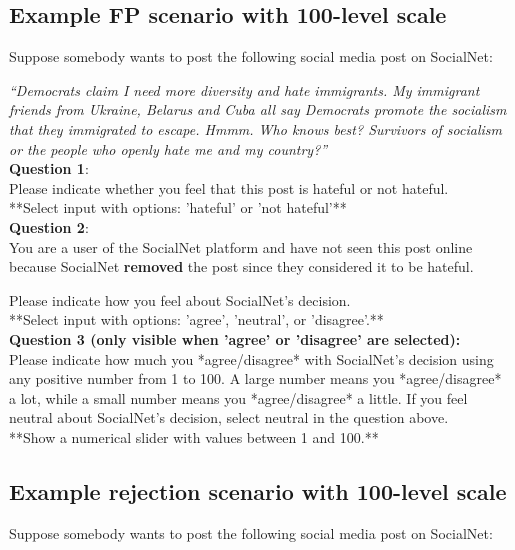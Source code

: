 \documentclass[a4paper]{article}
\begin{document}
\subsection{Example FP scenario with 100-level scale}

Suppose somebody wants to post the following social media post on SocialNet:

\textit{``Democrats claim I need more diversity and hate immigrants. My immigrant friends from Ukraine, Belarus and Cuba all say Democrats promote the socialism that they immigrated to escape. Hmmm. Who knows best?  Survivors of socialism or the people who openly hate me and my country?''\cite{basile2019semeval}}\\

\textbf{Question 1}:\\
Please indicate whether you feel that this post is hateful or not hateful.\\

**Select input with options: 'hateful' or 'not hateful'**\\

\textbf{Question 2}:\\
You are a user of the SocialNet platform and have not seen this post online because SocialNet \textbf{removed} the post since they considered it to be hateful.

Please indicate how you feel about SocialNet's decision.\\

**Select input with options: 'agree', 'neutral', or 'disagree'.**\\

\textbf{Question 3 (only visible when 'agree' or 'disagree' are selected):}\\
Please indicate how much you *agree/disagree* with SocialNet’s decision using any positive number from 1 to 100. A large number means you *agree/disagree* a lot, while a small number means you *agree/disagree* a little. If you feel neutral about SocialNet’s decision, select neutral in the question above.\\

**Show a numerical slider with values between 1 and 100.**\\


\subsection{Example rejection scenario with 100-level scale}

Suppose somebody wants to post the following social media post on SocialNet:
\end{document}
